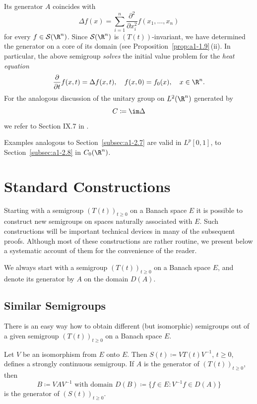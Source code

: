 Its generator $A$ coincides with
\[
    \Delta f(x) = \sum_{i=1}^{n} \frac{\partial^{2}}{\partial x_{i}^{2}} f(x_{1},\ldots,x_{n})
\]
for every $f \in \mathcal{S}(\R^{n})$.
Since $\mathcal{S}(\R^{n})$ is $(T(t))$-invariant, we have determined the generator on a core of its domain (see Proposition~\ref{prop:a1-1.9}\,(ii).
In particular, the above semigroup \emph{solves} the initial value problem for the \emph{heat equation}
\[
    \frac{\partial}{\partial t} f(x,t) = \Delta f(x,t), \quad f(x,0) = f_{0}(x), \quad x \in \R^{n}.
\]
For the analogous discussion of the unitary group on $L^{2}(\R^{n})$ generated by
\[
    C \coloneqq \im\Delta
\]
we refer to Section IX.7 in \textcite{reedsimon:1975}. 

Examples analogous to Section~\ref{subsec:a1-2.7} are valid in $L^{p}\left[ 0,1 \right]$, \resp to Section~\ref{subsec:a1-2.8} in $C_{0}(\R^{n})$.
\section{Standard Constructions}\label{sec:a1-3}%
Starting with a semigroup $(T(t))_{t \geq 0}$ on a Banach space $E$ it is possible to construct new semigroups on spaces naturally associated with $E$.
Such constructions will be important technical devices in many of the subsequent proofs.
Although most of these constructions are rather routine, we present below a systematic account of them for the convenience of the reader.

We always start with a semigroup $(T(t))_{t \geq 0}$ on a Banach space $E$, and denote its generator by $A$ on the domain $D(A)$.
\subsection{Similar Semigroups}\label{subsec:a1-3.1}%

There is an easy way how to obtain different (but isomorphic) semigroups out of a given semigroup $(T(t))_{t \geq 0}$ on a Banach space $E$.

Let $V$ be an isomorphism from $E$ onto $E$.
Then $S(t) \coloneqq VT(t)V^{-1}$, $t \geq 0$, defines a strongly continuous semigroup.
If\/ $A$ is the generator of\/ $(T(t))_{t \geq 0}$, then
\[
    B \coloneqq VAV^{-1} \text{ with domain } D(B) \coloneqq \{f \in E \colon V^{-1}f \in D(A)\}
\]
is the generator of\/ $(S(t))_{t \geq 0}$.
